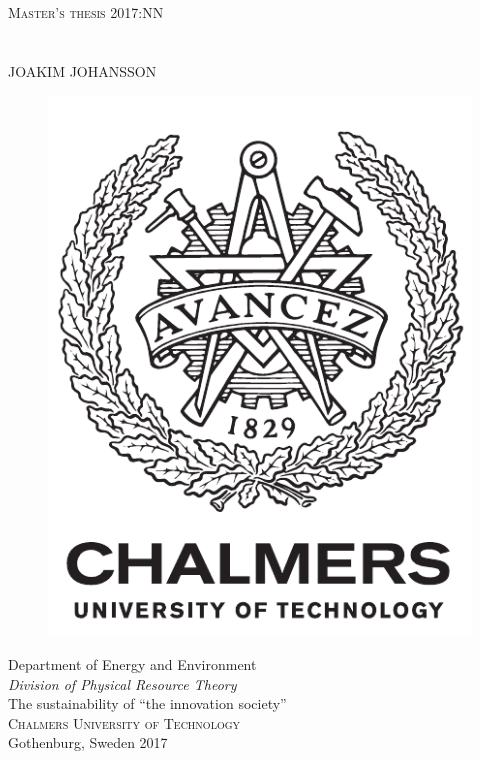 \newpage
\restoregeometry
\thispagestyle{empty}
\mbox{}


\newpage
\thispagestyle{empty}
\begin{center}
	\textsc{\large Master's thesis 2017:NN}\\[4cm]		%
	\textbf{\Large \reportTitle{}} \\[1cm]
	{\large \reportSubTitle{}}\\[1cm]
	{\large JOAKIM JOHANSSON}
	
	\vfill	
	\begin{figure}[H]
	\centering
	\includegraphics[width=0.2\pdfpagewidth]{figure/auxiliary/logo_eng.pdf} \\	
	\end{figure}	\vspace{5mm}	
	
	Department of Energy and Environment \\
	\emph{Division of Physical Resource Theory}\\
	The sustainability of “the innovation society”\\ %
	\textsc{Chalmers University of Technology} \\
	Gothenburg, Sweden 2017 \\
\end{center}


